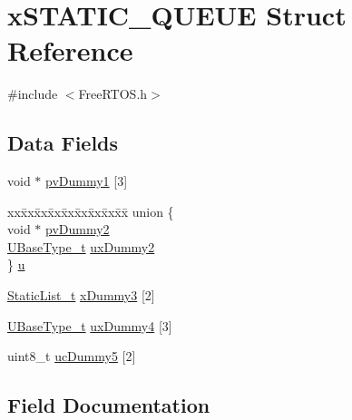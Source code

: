 \hypertarget{structx_s_t_a_t_i_c___q_u_e_u_e}{}\section{x\+S\+T\+A\+T\+I\+C\+\_\+\+Q\+U\+E\+UE Struct Reference}
\label{structx_s_t_a_t_i_c___q_u_e_u_e}


{\ttfamily \#include $<$Free\+R\+T\+O\+S.\+h$>$}

\subsection*{Data Fields}
\begin{DoxyCompactItemize}
\item 
void $\ast$ \mbox{\hyperlink{structx_s_t_a_t_i_c___q_u_e_u_e_ac563d82b4c6a843835118229de328aa7}{pv\+Dummy1}} \mbox{[}3\mbox{]}
\item 
\begin{tabbing}
xx\=xx\=xx\=xx\=xx\=xx\=xx\=xx\=xx\=\kill
union \{\\
\>void $\ast$ \mbox{\hyperlink{structx_s_t_a_t_i_c___q_u_e_u_e_a44b3b17a1410a0bcec9b416f2bc89a96}{pvDummy2}}\\
\>\mbox{\hyperlink{portmacro_8h_a646f89d4298e4f5afd522202b11cb2e6}{UBaseType\_t}} \mbox{\hyperlink{structx_s_t_a_t_i_c___q_u_e_u_e_a436a95e9535d609e10778297632bf306}{uxDummy2}}\\
\} \mbox{\hyperlink{structx_s_t_a_t_i_c___q_u_e_u_e_aac0e3868eae815ba838ffec1e48be76e}{u}}\\

\end{tabbing}\item 
\mbox{\hyperlink{_free_r_t_o_s_8h_a9735ad9101a2bd25f83a62089a4acee6}{Static\+List\+\_\+t}} \mbox{\hyperlink{structx_s_t_a_t_i_c___q_u_e_u_e_a2ea20ae87a814cd673deba85bbc35e5b}{x\+Dummy3}} \mbox{[}2\mbox{]}
\item 
\mbox{\hyperlink{portmacro_8h_a646f89d4298e4f5afd522202b11cb2e6}{U\+Base\+Type\+\_\+t}} \mbox{\hyperlink{structx_s_t_a_t_i_c___q_u_e_u_e_a8c2bd4532fb12e9c4ca67d2a5b0afc1a}{ux\+Dummy4}} \mbox{[}3\mbox{]}
\item 
uint8\+\_\+t \mbox{\hyperlink{structx_s_t_a_t_i_c___q_u_e_u_e_aad619753f8d76e096e76fbf07502d2c9}{uc\+Dummy5}} \mbox{[}2\mbox{]}
\end{DoxyCompactItemize}


\subsection{Field Documentation}
\mbox{\label{structx_s_t_a_t_i_c___q_u_e_u_e_ac563d82b4c6a843835118229de328aa7}} 
